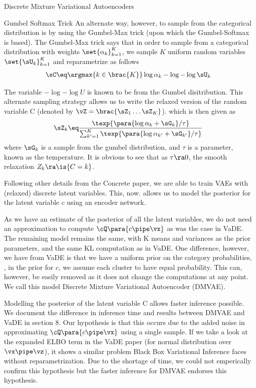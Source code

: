 \documentclass{article}
\begin{document}
\begin{psection}{Discrete Mixture Variational Autoencoders}
\begin{psubsection}{Gumbel Softmax Trick}
		An alternate way, however, to sample from the categorical distribution is by using the Gumbel-Max trick (upon which the Gumbel-Softmax is based). The Gumbel-Max trick says that in order to sample from a categorical distribution with weights $\set{\alpha_k}_{k = 1}^K$, we sample $K$ uniform random variables $\set{\sU_k}_{k = 1}^{K}$ and reparametrize as follows
		\begin{align*}
			\sC \eq \argmax{k \in \brac{K}} \log{\alpha_k} - \log{- \log{\sU_k}}
		\end{align*}

		The variable $-\log{-\log{U}}$ is known to be from the Gumbel disitribution. This alternate sampling strategy allows us to write the relaxed version of the random variable C (denoted by $\vZ = \brac{\sZ_1 \dots \sZ_K}$). which is then given as
		\begin{align*}
			\sZ_k \eq \frac{\texp{\para{\log{\alpha_k} + \sG_k} / \tau}}{\sum_{k' = 1}^K \texp{\para{\log{\alpha_{k'}} + \sG_{k'}} / \tau}}
		\end{align*}
		where $\sG_k$ is a sample from the gumbel distribution, and $\tau$ is a parameter, known as the temperature. It is obvious to see that as $\tau \ra 0$, the smooth relaxation $Z_k \ra \is{C = k}$.

		Following other details from the Concrete paper, we are able to train VAEs with (relaxed) discrete latent variables. This, now. allows us to model the posterior for the latent variable $c$ using an encoder network.

	\end{psubsection}

	As we have an estimate of the posterior of all the latent variables, we do not need an approximation to compute $\cQ\para{c \pipe \vx}$ as was the case in VaDE. The remaining model remains the same, with K means and variances as the prior parameters, and the same KL computation as in VaDE. One difference, however, we have from VaDE is that we have a uniform prior on the category probabilities, \ie, in the prior for $c$, we assume each cluster to have equal probability. This can, however, be easily removed as it does not change the computations at any point. We call this model Discrete Mixture Variational Autoencoder (DMVAE).

	Modelling the posterior of the latent variable C allows faster inference possible. We document the difference in inference time and results between DMVAE and VaDE in section 8. Our hypothesis is that this occurs due to the added noise in approximating $\cQ\para{c \pipe \vx}$ using a single sample. If we take a look at the expanded ELBO term in the VaDE paper (for normal distribution over $\vx \pipe \vz$), it shows a similar problem Black Box Variational Inference faces without reparametrization. Due to the shortage of time, we could not emperically confirm this hypothesis but the faster inference for DMVAE endorses this hypothesis.


\end{psection}
\end{document}
